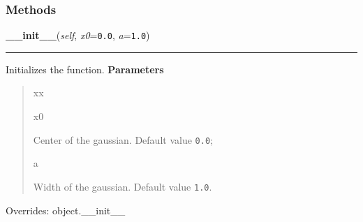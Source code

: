 
  \subsubsection{Methods}

    \vspace{0.5ex}

\hspace{.8\funcindent}\begin{boxedminipage}{\funcwidth}

    \raggedright \textbf{\_\_init\_\_}(\textit{self}, \textit{x0}={\tt 0.0}, \textit{a}={\tt 1.0})

    \vspace{-1.5ex}

    \rule{\textwidth}{0.5\fboxrule}
\setlength{\parskip}{2ex}

Initializes the function.
\setlength{\parskip}{1ex}
      \textbf{Parameters}
      \vspace{-1ex}

      \begin{quote}
        \begin{Ventry}{xx}

          \item[x0]


Center of the gaussian. Default value \texttt{0.0};
          \item[a]


Width of the gaussian. Default value \texttt{1.0}.
        \end{Ventry}

      \end{quote}

      Overrides: object.\_\_init\_\_

    \end{boxedminipage}

    \vspace{0.5ex}

